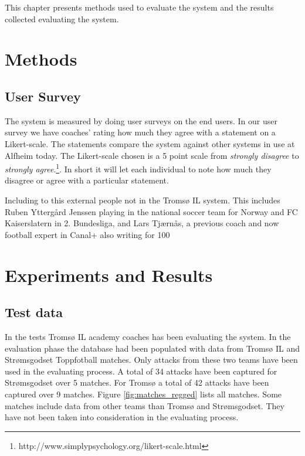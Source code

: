 This chapter presents methods used to evaluate the system and the results collected evaluating the system. 

\section{Methods}

\subsection{User Survey}

The system is measured by doing user surveys on the end users. In our user survey we have coaches’ rating how much they agree with a statement on a Likert-scale. The statements compare the system against other systems in use at Alfheim today. The Likert-scale chosen is a 5 point scale from \textit{strongly disagree} to \textit{strongly agree}.\footnote{http://www.simplypsychology.org/likert-scale.html}. In short it will let each individual to note how much they disagree or agree with a particular statement.

Including to this external people not in the Tromsø IL system. This includes Ruben Yttergård Jenssen playing in the national soccer team for Norway and FC Kaiserslatern in 2. Bundesliga, and Lars Tjærnås, a previous coach and now football expert in Canal+ also writing for 100%

\section{Experiments and Results}

\subsection{Test data}

In the tests Tromsø IL academy coaches has been evaluating the system. In the evaluation phase the database had been populated with data from Tromsø IL and Strømsgodset Toppfotball matches. Only attacks from these two teams have been used in the evaluating process. A total of 34 attacks have been captured for Strømsgodset over 5 matches. For Tromsø a total of 42 attacks have been captured over 9 matches. Figure \ref{fig:matches_regged} lists all matches. Some matches include data from other teams than Tromsø and Strømsgodset. They have not been taken into consideration in the evaluating process.

